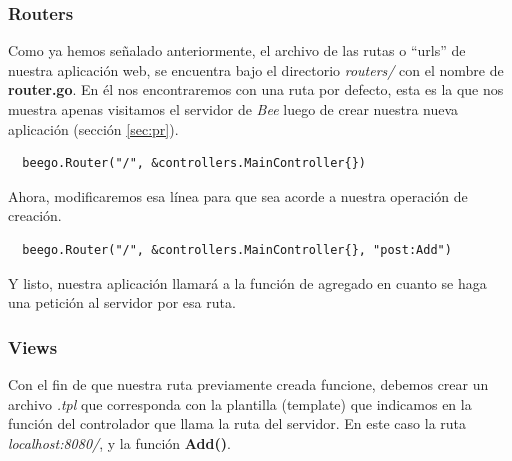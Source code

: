 \documentclass[12pt]{article}
\begin{document}
\subsubsection{Routers}
Como ya hemos señalado anteriormente, el archivo de las rutas o ``urls'' de nuestra
aplicación web, se encuentra bajo el directorio \textit{routers/} con el nombre de
\textbf{router.go}. En él nos encontraremos con una ruta por defecto, esta es la que
nos muestra apenas visitamos el servidor de \textit{Bee} luego de crear nuestra
nueva aplicación (sección \ref{sec:pr}).
\begin{verbatim}
  beego.Router("/", &controllers.MainController{})
\end{verbatim}
Ahora, modificaremos esa línea para que sea acorde a nuestra operación de creación.
\begin{verbatim}
  beego.Router("/", &controllers.MainController{}, "post:Add")
\end{verbatim}
Y listo, nuestra aplicación llamará a la función de agregado en cuanto se haga
una petición al servidor por esa ruta.
\subsubsection{Views}\label{sec:unov}
Con el fin de que nuestra ruta previamente creada funcione, debemos crear un
archivo \textit{.tpl} que corresponda con la plantilla (template) que indicamos
en la función del controlador que llama la ruta del servidor. En este caso la ruta
\textit{localhost:8080/}, y la función \textbf{Add()}. \\
\end{document}
